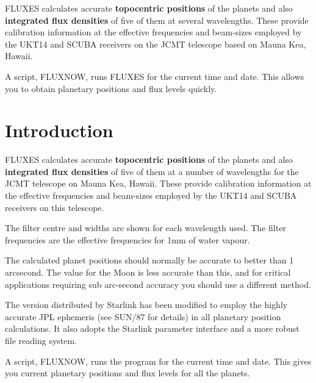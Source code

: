 \documentclass[11pt,twoside]{article}
\newcommand{\stardocinitials}  {SUN}
\newcommand{\stardocnumber}    {213.3}
\newcommand{\stardocabstract}  {
FLUXES calculates accurate {\bf topocentric positions} of the planets and also
{\bf integrated flux densities} of five of them at several wavelengths.
These provide calibration information at the effective frequencies and
beam-sizes employed by the UKT14 and SCUBA receivers on the 
JCMT telescope based on Mauna Kea, Hawaii. 

A script, FLUXNOW, runs FLUXES for the current time and date.
This allows you to obtain planetary positions and flux levels quickly.
}
\newcommand{\stardocname}{\stardocinitials /\stardocnumber}
\newcommand{\htmladdnormallink}[2]{#1}
\newenvironment{latexonly}{}{}
\newcommand{\xref}[3]{#1}
\newcommand{\xlabel}[1]{}
\renewcommand{\_}{\texttt{\symbol{95}}}
\renewcommand{\thepage}{\roman{page}}
\begin{document}
\stardocabstract
  \newpage
  \begin{latexonly}
    \setlength{\parskip}{0mm}
    \tableofcontents
    \setlength{\parskip}{\medskipamount}
    \markboth{\stardocname}{\stardocname}
  \end{latexonly}

\cleardoublepage
\renewcommand{\thepage}{\arabic{page}}
\setcounter{page}{1}

\section{Introduction}
\xlabel{INTRODUCTION}
\label{sec:introduction}

FLUXES calculates accurate \textbf{topocentric positions} of the planets and
also \textbf{integrated flux densities} of five of them at a number of
wavelengths for the 
\htmladdnormallink{JCMT telescope}{http://www.jach.hawaii.edu/JCMT/home.html} 
on Mauna Kea, Hawaii.  These provide calibration information at the effective
frequencies and beam-sizes employed by the UKT14 and SCUBA receivers on this
telescope.

The filter centre and widths are shown for each wavelength used.  The filter
frequencies are the effective frequencies for 1mm of water vapour.

The calculated planet positions should normally be accurate to better than 1
arcsecond. The value for the Moon is less accurate than this, and for critical
applications requiring sub arc-second accuracy you should use a different
method.

The version distributed by Starlink has been modified to employ the highly
accurate \xref{JPL ephemeris}{sun87}{} (see \xref{SUN/87}{sun87}{} for
details) in all planetary position calculations. It also adopts the Starlink
parameter interface and a more robust file reading system.

A script, FLUXNOW, runs the program for the current time and date.  This gives
you current planetary positions and flux levels for all the planets.
\end{document}
